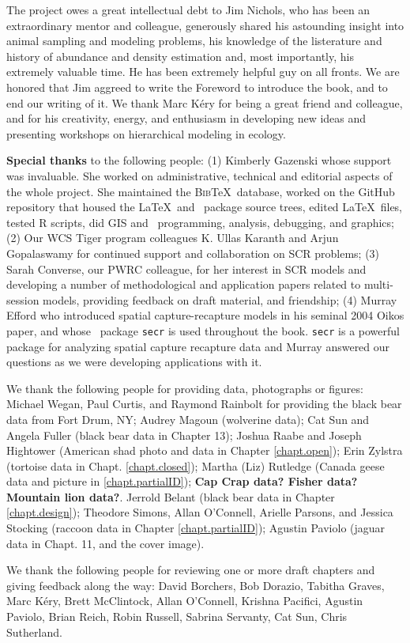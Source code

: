 
The project owes a great intellectual debt to Jim Nichols, who has
been an extraordinary mentor and colleague, generously shared his
astounding insight into animal sampling and modeling problems, his
knowledge
of the listerature and history of abundance and density estimation
and, most importantly, his extremely valuable time. 
He has 
been extremely helpful guy on all fronts. We are honored that Jim
aggreed to write the Foreword to introduce the book, and to end our
writing of it.
 We thank Marc K\'{e}ry
for being a great friend and colleague, and for his creativity, %
energy, and enthusiasm in developing new ideas and
presenting workshops on hierarchical modeling in ecology.

{\bf Special thanks} to the following people: (1) Kimberly Gazenski whose support was
invaluable. She worked on administrative, technical and editorial
aspects of the whole project. She maintained the \textsc{Bib}\TeX~database,
worked on the GitHub repository that housed the \LaTeX~and \R~package
source trees, edited \LaTeX~files, tested R scripts, did GIS and
\R~programming, analysis, debugging, and graphics;  (2) Our WCS Tiger
program colleagues K. Ullas Karanth and Arjun Gopalaswamy for
continued support and collaboration on SCR problems;  (3) Sarah
Converse, our PWRC colleague, for her interest in SCR models and
developing a number of methodological and application papers related
to multi-session models, providing feedback on draft material, and
friendship;  (4) Murray Efford who introduced spatial
capture-recapture models %
in his seminal 2004 Oikos paper, and whose \R~package \mbox{\tt secr} is used
throughout the book.  \mbox{\tt secr} is a powerful package for analyzing
spatial capture recapture data and Murray answered our questions as we
were developing applications with it.


We thank the following people for providing data, photographs or figures:
Michael Wegan, Paul Curtis, and Raymond Rainbolt for providing the black bear data from Fort Drum, NY;
Audrey Magoun (wolverine data); Cat Sun and Angela Fuller (black bear
data in Chapter 13); Joshua Raabe and Joseph Hightower (American shad
photo and data in Chapter \ref{chapt.open}); Erin Zylstra (tortoise
data in Chapt. \ref{chapt.closed}); Martha (Liz) Rutledge (Canada geese
data and picture in \ref{chapt.partialID});  {\bf Cap Crap data?
  Fisher data?  Mountain lion data?}.  Jerrold Belant (black bear data
in Chapter \ref{chapt.design}); Theodore Simons, Allan O'Connell,
Arielle Parsons, and Jessica Stocking (raccoon data in Chapter
\ref{chapt.partialID}); Agustin Paviolo (jaguar data in Chapt. 11, and
the cover image).

We thank the following people for reviewing one or more draft chapters
and giving feedback along the way:
David Borchers,
Bob Dorazio,
Tabitha Graves,
Marc K\'{e}ry,   %
Brett McClintock,
Allan O'Connell,
Krishna Pacifici,
Agustin Paviolo,
Brian Reich,
Robin Russell,
Sabrina Servanty,
Cat Sun,
Chris Sutherland.

